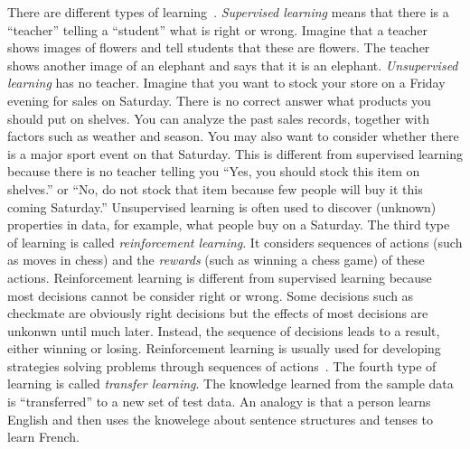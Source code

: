 There are different types of
learning~\cite{Goodfellow2016DeepLearning}.  {\it Supervised learning}
means that there is a ``teacher'' telling a ``student'' what is right
or wrong. Imagine that a teacher shows images of flowers and tell
students that these are flowers. The teacher shows another image of an
elephant and says that it is an elephant.  {\it Unsupervised learning}
has no teacher. Imagine that you want to stock your store on a Friday
evening for sales on Saturday.  There is no correct answer what
products you should put on shelves.  You can analyze the past sales
records, together with factors such as weather and season.  You may
also want to consider whether there is a major sport event on that
Saturday.  This is different from supervised learning because there is
no teacher telling you ``Yes, you should stock this item on shelves.''
or ``No, do not stock that item because few people will buy it this
coming Saturday.''  Unsupervised learning is often used to discover
(unknown) properties in data, for example, what people buy on a
Saturday.  The third type of learning is called {\it reinforcement
  learning}.  It considers sequences of actions (such as moves in
chess) and the {\it rewards} (such as winning a chess game) of these
actions.  Reinforcement learning is different from supervised learning
because most decisions cannot be consider right or wrong. Some
decisions such as checkmate are obviously right decisions but the
effects of most decisions are unkonwn until much later. Instead, the
sequence of decisions leads to a result, either winning or
losing. Reinforcement learning is usually used for developing
strategies solving problems through sequences of
actions~\cite{Sutton2017ReinforcementLearningIntroduction}.  The
fourth type of learning is called {\it transfer learning}.  The
knowledge learned from the sample data is ``transferred'' to a new set
of test data.  An analogy is that a person learns English and then
uses the knowelege about sentence structures and tenses to learn
French.




